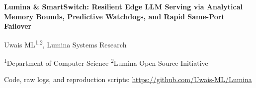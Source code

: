 \documentclass[11pt,a4paper]{article}
\begin{document}
\begin{center}
{\LARGE\bfseries Lumina \& SmartSwitch: Resilient Edge LLM Serving via Analytical Memory Bounds, Predictive Watchdogs, and Rapid Same-Port Failover\par}
\vspace{10pt}
{\large Uwais ML\textsuperscript{1,2}, Lumina Systems Research\par}
\vspace{3pt}
{\small \textsuperscript{1}Department of Computer Science \quad \textsuperscript{2}Lumina Open-Source Initiative\par}
\vspace{4pt}
{\small Code, raw logs, and reproduction scripts: \url{https://github.com/Uwais-ML/Lumina}\par}
\end{center}
\vspace{4pt}
\end{document}

